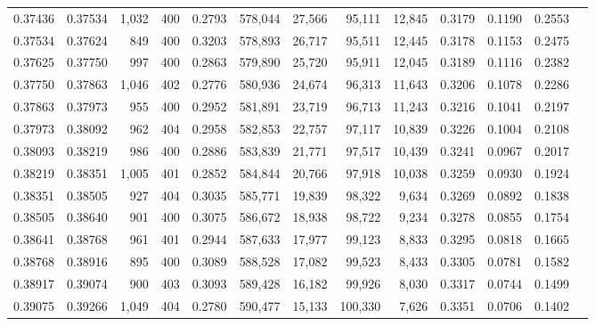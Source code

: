 \begin{tabular}{rrrrrrrrrrrrr}
0.37436 & 0.37534 &  1,032 & 400 &                                     0.2793 & 578,044 &  27,566 &  95,111 &  12,845 & 0.3179 & 0.1190 & 0.2553 \\
0.37534 & 0.37624 &    849 & 400 &                                     0.3203 & 578,893 &  26,717 &  95,511 &  12,445 & 0.3178 & 0.1153 & 0.2475 \\
0.37625 & 0.37750 &    997 & 400 &                                     0.2863 & 579,890 &  25,720 &  95,911 &  12,045 & 0.3189 & 0.1116 & 0.2382 \\
0.37750 & 0.37863 &  1,046 & 402 &                                     0.2776 & 580,936 &  24,674 &  96,313 &  11,643 & 0.3206 & 0.1078 & 0.2286 \\
0.37863 & 0.37973 &    955 & 400 &                                     0.2952 & 581,891 &  23,719 &  96,713 &  11,243 & 0.3216 & 0.1041 & 0.2197 \\
0.37973 & 0.38092 &    962 & 404 &                                     0.2958 & 582,853 &  22,757 &  97,117 &  10,839 & 0.3226 & 0.1004 & 0.2108 \\
0.38093 & 0.38219 &    986 & 400 &                                     0.2886 & 583,839 &  21,771 &  97,517 &  10,439 & 0.3241 & 0.0967 & 0.2017 \\
0.38219 & 0.38351 &  1,005 & 401 &                                     0.2852 & 584,844 &  20,766 &  97,918 &  10,038 & 0.3259 & 0.0930 & 0.1924 \\
0.38351 & 0.38505 &    927 & 404 &                                     0.3035 & 585,771 &  19,839 &  98,322 &   9,634 & 0.3269 & 0.0892 & 0.1838 \\
0.38505 & 0.38640 &    901 & 400 &                                     0.3075 & 586,672 &  18,938 &  98,722 &   9,234 & 0.3278 & 0.0855 & 0.1754 \\
0.38641 & 0.38768 &    961 & 401 &                                     0.2944 & 587,633 &  17,977 &  99,123 &   8,833 & 0.3295 & 0.0818 & 0.1665 \\
0.38768 & 0.38916 &    895 & 400 &                                     0.3089 & 588,528 &  17,082 &  99,523 &   8,433 & 0.3305 & 0.0781 & 0.1582 \\
0.38917 & 0.39074 &    900 & 403 &                                     0.3093 & 589,428 &  16,182 &  99,926 &   8,030 & 0.3317 & 0.0744 & 0.1499 \\
0.39075 & 0.39266 &  1,049 & 404 &                                     0.2780 & 590,477 &  15,133 & 100,330 &   7,626 & 0.3351 & 0.0706 & 0.1402 \\

\end{tabular}

